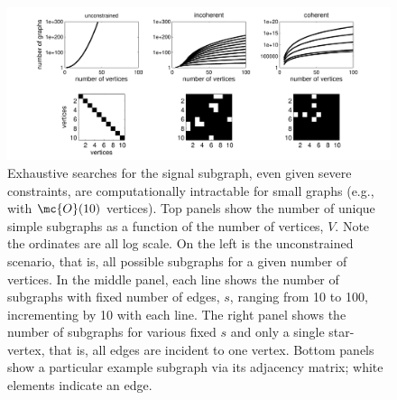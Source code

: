 \documentclass[10pt,journal,cspaper,compsoc]{IEEEtran}
\begin{document}



\begin{figure}[tb!]
	\centering
		\includegraphics[width=1.0\linewidth]{../figs/num_of_graphs.pdf}
	\caption{Exhaustive searches for the signal subgraph, even given severe constraints, are computationally intractable for small graphs (e.g., with $\mc{O}(10)$ vertices).  Top panels show the number of unique simple subgraphs as a function of the number of vertices, $V$.  Note the ordinates are all log scale.   On the left is the unconstrained scenario, that is, all possible subgraphs for a given number of vertices.  In the middle panel, each line shows the number of subgraphs with fixed number of edges, $s$, ranging from 10 to 100, incrementing by 10 with each line.  The right panel shows the number of subgraphs for various fixed $s$ and only a single star-vertex, that is, all edges are incident to one vertex.  Bottom panels show a particular example subgraph via its adjacency matrix; white elements indicate an edge.}
	\label{fig:numgraphs}
\end{figure}
\end{document}
